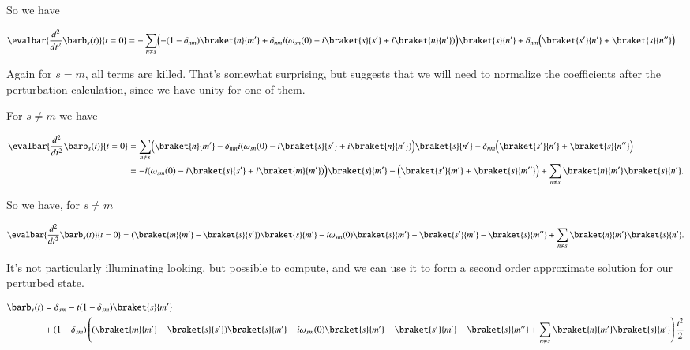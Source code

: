 So we have

\begin{align*}
\evalbar{\frac{d^2}{dt^2} \barb_s(t)}{t=0} 
&= - \sum_{n \ne s} 
\Bigl(
- (1 - \delta_{nm}) \braket{n}{m'}
+
\delta_{nm} i 
(
\omega_{sn}(0) - i\braket{s}{s'} + i\braket{n}{n'}
)
\Bigr)
\braket{s}{n'}
+\delta_{nm} 
\Bigl( 
\braket{s'}{n'}
+\braket{s}{n''}
\Bigr)
\end{align*}

Again for $s = m$, all terms are killed.  That's somewhat surprising, but suggests that we will need to normalize the coefficients after the perturbation calculation, since we have unity for one of them.

For $s \ne m$ we have

\begin{align*}
\evalbar{\frac{d^2}{dt^2} \barb_s(t)}{t=0} 
&= \sum_{n \ne s} 
\Bigl(
\braket{n}{m'}
-
\delta_{nm} i 
(
\omega_{sn}(0) - i\braket{s}{s'} + i\braket{n}{n'}
)
\Bigr)
\braket{s}{n'}
-\delta_{nm} 
\Bigl( 
\braket{s'}{n'}
+\braket{s}{n''}
\Bigr) \\
&= 
-
i 
(
\omega_{sm}(0) - i\braket{s}{s'} + i\braket{m}{m'}
)
\Bigr)
\braket{s}{m'}
-
\Bigl( 
\braket{s'}{m'}
+\braket{s}{m''}
\Bigr) 
+
\sum_{n \ne s} 
\braket{n}{m'} \braket{s}{n'}.
\end{align*}

So we have, for $s \ne m$ 

\begin{equation}\label{eqn:adiabaticApprox:330}
\evalbar{\frac{d^2}{dt^2} \barb_s(t)}{t=0} 
= 
(\braket{m}{m'} - \braket{s}{s'} ) \braket{s}{m'}
-i \omega_{sm}(0) \braket{s}{m'}
-
\braket{s'}{m'}
-\braket{s}{m''}
+
\sum_{n \ne s} 
\braket{n}{m'} \braket{s}{n'}.
\end{equation}

It's not particularly illuminating looking, but possible to compute, and we can use it to form a second order approximate solution for our perturbed state.

\begin{equation}\label{eqn:adiabaticApprox:350}
\begin{aligned}
\barb_s(t) 
&=
\delta_{sm} - t (1 - \delta_{sm}) \braket{s}{m'} \\
&+
(1 - \delta_{sm})
\left(
(\braket{m}{m'} - \braket{s}{s'} ) \braket{s}{m'}
-i \omega_{sm}(0) \braket{s}{m'}
-
\braket{s'}{m'}
-\braket{s}{m''}
+
\sum_{n \ne s} 
\braket{n}{m'} \braket{s}{n'}
\right) \frac{t^2}{2}
\end{aligned}
\end{equation}

